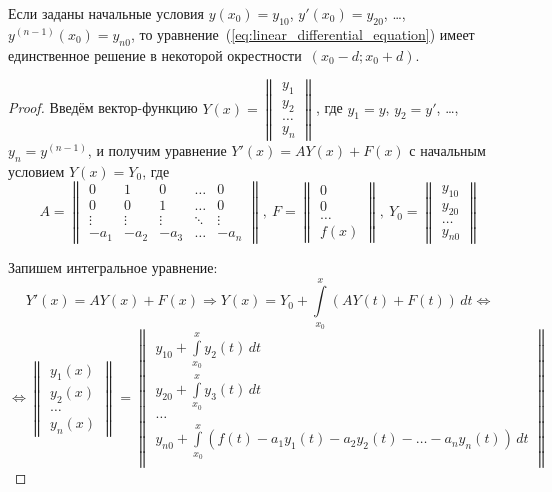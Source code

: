 \begin{theorem}
Если заданы начальные условия $y(x_0) = y_{10}$, $y'(x_0) = y_{20}$, \ldots, $y^{(n-1)}(x_0) = y_{n0}$, то уравнение~(\ref*{eq:linear_differential_equation}) имеет единственное решение в некоторой окрестности~$(x_0 - d; x_0 + d)$.
\end{theorem}
\begin{proof}
Введём вектор-функцию $Y(x) =
\begin{Vmatrix}
y_1 \\
y_2 \\
\ldots \\
y_n
\end{Vmatrix}$, где $y_1 = y$, $y_2 = y'$, \ldots, $y_n = y^{(n-1)}$,
и получим уравнение $Y'(x) = A Y(x) + F(x)$ с начальным условием $Y(x) = Y_0$, где
\begin{equation*}
A =
\begin{Vmatrix}
0 & 1 & 0 & \ldots & 0 \\
0 & 0 & 1 & \ldots & 0 \\
\vdots & \vdots & \vdots & \ddots & \vdots \\
-a_1 & -a_2 & -a_3 & \ldots & -a_n
\end{Vmatrix}, \
F =
\begin{Vmatrix}
0 \\
0 \\
\ldots \\
f(x)
\end{Vmatrix}, \
Y_0 =
\begin{Vmatrix}
y_{10} \\
y_{20} \\
\ldots \\
y_{n0}
\end{Vmatrix}
\end{equation*}

Запишем интегральное уравнение:
\begin{equation*}
Y'(x) = A Y(x) + F(x) \Rightarrow
Y(x) = Y_0 + \int\limits_{x_0}^x (A Y(t) + F(t))\,dt \Leftrightarrow
\end{equation*}
\begin{equation*}
\Leftrightarrow \begin{Vmatrix}
y_1(x) \\
y_2(x) \\
\ldots \\
y_n(x)
\end{Vmatrix} =
\begin{Vmatrix}
y_{10} + \int\limits_{x_0}^x y_2(t)\,dt \\
y_{20} + \int\limits_{x_0}^x y_3(t)\,dt \\
\ldots \\
y_{n0} + \int\limits_{x_0}^x (f(t) - a_1 y_1(t) - a_2 y_2(t) - \ldots - a_n y_n(t))\,dt \\
\end{Vmatrix}
\end{equation*}


\end{proof}
